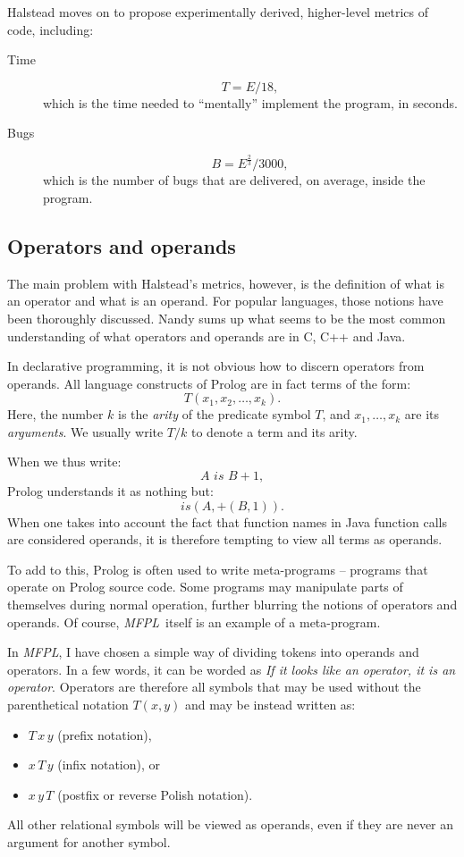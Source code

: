 \documentclass[11pt,a4paper,twoside]{article}
\newcommand{\pname}{\emph{MFPL}}
\begin{document}
\begin{multicols}{2}
Halstead moves on to propose experimentally derived, higher-level
metrics of code, including:
\begin{description}
\item[Time]
$$T = E/18,$$ which is the time needed to ``mentally'' implement the
  program, in seconds.
\item[Bugs]
$$B = E^{\frac{2}{3}}/3000,$$ which is the number of bugs that are
  delivered, on average, inside the program.
\end{description}

\subsection{Operators and operands}
The main problem with Halstead's metrics, however, is the definition
of what is an operator and what is an operand. For popular languages,
those notions have been thoroughly discussed. Nandy \cite{nandy} sums
up what seems to be the most common understanding of what operators
and operands are in C, C++ and Java. 

In declarative programming, it is not obvious how to discern operators
from operands. All language constructs of Prolog are in fact terms of
the form:
$$T(x_1, x_2, \dots, x_k).$$ 
Here, the number $k$ is the \emph{arity}
of the predicate symbol $T$, and $x_1, \dots, x_k$ are its
\emph{arguments}. We usually write $T/k$ to denote a term and its arity. 

When we thus write:
$$A\,\, is\,\, B + 1,$$ 
Prolog understands it as nothing but:
$$is(A, +(B, 1)).$$ 
When one takes into account the fact that function
names in Java function calls are considered operands, it is therefore
tempting to view all terms as operands.

To add to this, Prolog is often used to write meta-programs --
programs that operate on Prolog source code. Some programs may
manipulate parts of themselves during normal operation, further
blurring the notions of operators and operands. Of course,
\pname\ itself is an example of a meta-program.

In \pname, I have chosen a simple way of dividing tokens into operands
and operators. In a few words, it can be worded as \emph{If it looks
  like an operator, it is an operator}. Operators are therefore all
symbols that may be used without the parenthetical notation $T(x, y)$
and may be instead written as: 
\begin{itemize}
\item $T\, x\, y$ (prefix notation),
\item $x\,T\, y$ (infix notation), or 
\item $x\, y\, T$ (postfix or reverse Polish notation).
\end{itemize}
All other relational symbols will be viewed as operands, even if they
are never an argument for another symbol.


\end{multicols}
\end{document}
